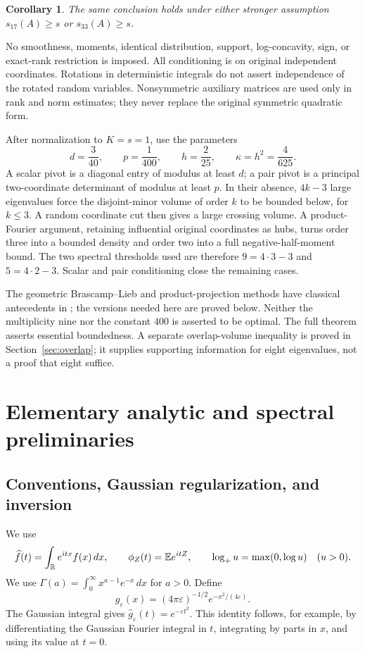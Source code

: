 \documentclass[11pt]{article}
\numberwithin{equation}{section}
\newtheorem{corollary}[theorem]{Corollary}
\theoremstyle{definition}\newtheorem{definition}[theorem]{Definition}
\theoremstyle{remark}\newtheorem{remark}[theorem]{Remark}
\newcommand{\R}{\mathbb R}\newcommand{\E}{\mathbb E}\newcommand{\PP}{\mathbb P}
\newcommand{\1}{\mathbf 1}\newcommand{\diag}{\operatorname{diag}}
\begin{document}
\begin{corollary}\label{cor:33}
The same conclusion holds under either stronger assumption $s_{17}(A)\ge s$ or $s_{33}(A)\ge s$.
\end{corollary}

No smoothness, moments, identical distribution, support, log-concavity, sign, or exact-rank restriction is imposed. All conditioning is on original independent coordinates. Rotations in deterministic integrals do not assert independence of the rotated random variables. Nonsymmetric auxiliary matrices are used only in rank and norm estimates; they never replace the original symmetric quadratic form.

After normalization to $K=s=1$, use the parameters
\begin{equation}\label{eq:parameters}
 d=\frac3{40},\qquad p=\frac1{400},\qquad h=\frac2{25},\qquad\kappa=h^2=\frac4{625}.
\end{equation}
A scalar pivot is a diagonal entry of modulus at least $d$; a pair pivot is a principal two-coordinate determinant of modulus at least $p$. In their absence, $4k-3$ large eigenvalues force the disjoint-minor volume of order $k$ to be bounded below, for $k\le3$. A random coordinate cut then gives a large crossing volume. A product-Fourier argument, retaining influential original coordinates as hubs, turns order three into a bounded density and order two into a full negative-half-moment bound. The two spectral thresholds used are therefore $9=4\cdot3-3$ and $5=4\cdot2-3$. Scalar and pair conditioning close the remaining cases.

The geometric Brascamp--Lieb and product-projection methods have classical antecedents in \cite{BCCT,RV}; the versions needed here are proved below. Neither the multiplicity nine nor the constant $400$ is asserted to be optimal. The full theorem asserts essential boundedness. A separate overlap-volume inequality is proved in Section~\ref{sec:overlap}; it supplies supporting information for eight eigenvalues, not a proof that eight suffice.

\section{Elementary analytic and spectral preliminaries}
\subsection{Conventions, Gaussian regularization, and inversion}
We use
\[
 \widehat f(t)=\int_\R e^{itx}f(x)\,dx,\qquad
 \phi_Z(t)=\E e^{itZ},\qquad
 \logp u=\max(0,\log u)\quad(u>0).
\]
We use $\Gamma(a)=\int_0^\infty x^{a-1}e^{-x}\,dx$ for $a>0$. Define
\[
 g_\varepsilon(x)=(4\pi\varepsilon)^{-1/2}e^{-x^2/(4\varepsilon)}.
\]
The Gaussian integral gives $\widehat g_\varepsilon(t)=e^{-\varepsilon t^2}$. This identity follows, for example, by differentiating the Gaussian Fourier integral in $t$, integrating by parts in $x$, and using its value at $t=0$.
\end{document}
